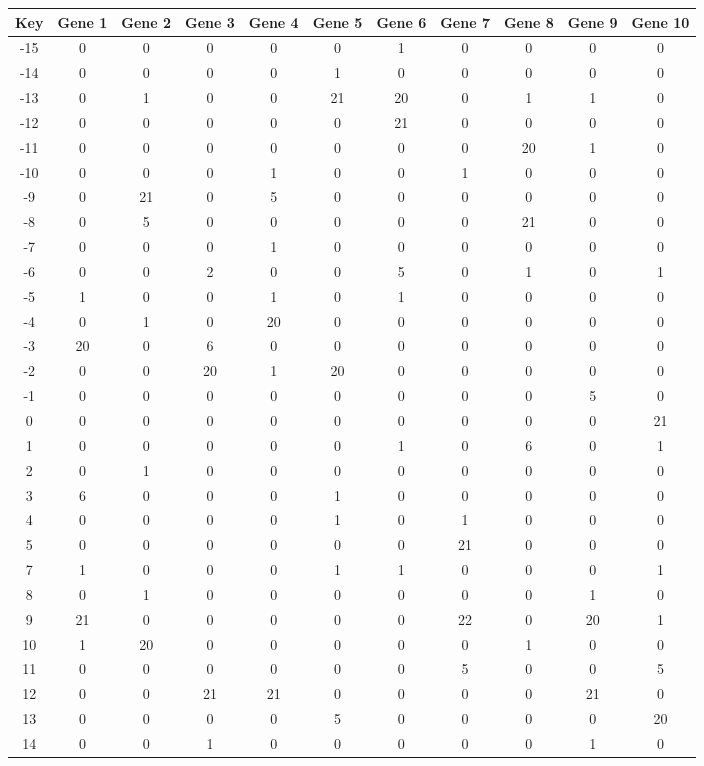 \begin{tabular}{|c|c|c|c|c|c|c|c|c|c|c|}
\hline
Key & Gene 1 & Gene 2 & Gene 3 & Gene 4 & Gene 5 & Gene 6 & Gene 7 & Gene 8 & Gene 9 & Gene 10 \\
\hline
-15 & 0 & 0 & 0 & 0 & 0 & 1 & 0 & 0 & 0 & 0 \\
-14 & 0 & 0 & 0 & 0 & 1 & 0 & 0 & 0 & 0 & 0 \\
-13 & 0 & 1 & 0 & 0 & 21 & 20 & 0 & 1 & 1 & 0 \\
-12 & 0 & 0 & 0 & 0 & 0 & 21 & 0 & 0 & 0 & 0 \\
-11 & 0 & 0 & 0 & 0 & 0 & 0 & 0 & 20 & 1 & 0 \\
-10 & 0 & 0 & 0 & 1 & 0 & 0 & 1 & 0 & 0 & 0 \\
-9 & 0 & 21 & 0 & 5 & 0 & 0 & 0 & 0 & 0 & 0 \\
-8 & 0 & 5 & 0 & 0 & 0 & 0 & 0 & 21 & 0 & 0 \\
-7 & 0 & 0 & 0 & 1 & 0 & 0 & 0 & 0 & 0 & 0 \\
-6 & 0 & 0 & 2 & 0 & 0 & 5 & 0 & 1 & 0 & 1 \\
-5 & 1 & 0 & 0 & 1 & 0 & 1 & 0 & 0 & 0 & 0 \\
-4 & 0 & 1 & 0 & 20 & 0 & 0 & 0 & 0 & 0 & 0 \\
-3 & 20 & 0 & 6 & 0 & 0 & 0 & 0 & 0 & 0 & 0 \\
-2 & 0 & 0 & 20 & 1 & 20 & 0 & 0 & 0 & 0 & 0 \\
-1 & 0 & 0 & 0 & 0 & 0 & 0 & 0 & 0 & 5 & 0 \\
0 & 0 & 0 & 0 & 0 & 0 & 0 & 0 & 0 & 0 & 21 \\
1 & 0 & 0 & 0 & 0 & 0 & 1 & 0 & 6 & 0 & 1 \\
2 & 0 & 1 & 0 & 0 & 0 & 0 & 0 & 0 & 0 & 0 \\
3 & 6 & 0 & 0 & 0 & 1 & 0 & 0 & 0 & 0 & 0 \\
4 & 0 & 0 & 0 & 0 & 1 & 0 & 1 & 0 & 0 & 0 \\
5 & 0 & 0 & 0 & 0 & 0 & 0 & 21 & 0 & 0 & 0 \\
7 & 1 & 0 & 0 & 0 & 1 & 1 & 0 & 0 & 0 & 1 \\
8 & 0 & 1 & 0 & 0 & 0 & 0 & 0 & 0 & 1 & 0 \\
9 & 21 & 0 & 0 & 0 & 0 & 0 & 22 & 0 & 20 & 1 \\
10 & 1 & 20 & 0 & 0 & 0 & 0 & 0 & 1 & 0 & 0 \\
11 & 0 & 0 & 0 & 0 & 0 & 0 & 5 & 0 & 0 & 5 \\
12 & 0 & 0 & 21 & 21 & 0 & 0 & 0 & 0 & 21 & 0 \\
13 & 0 & 0 & 0 & 0 & 5 & 0 & 0 & 0 & 0 & 20 \\
14 & 0 & 0 & 1 & 0 & 0 & 0 & 0 & 0 & 1 & 0 \\
\hline
\end{tabular}